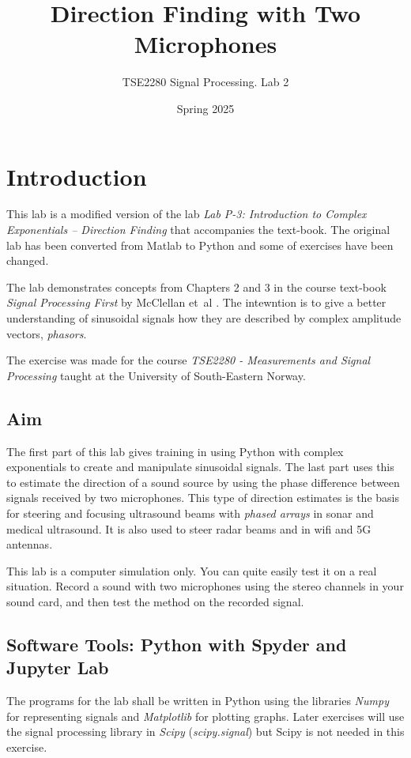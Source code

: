 


\logo
\thispagestyle{fancy}	

\title{Direction Finding with Two Microphones} 
\author{TSE2280 Signal Processing. Lab 2}
\date{Spring 2025}
\maketitle


\section{Introduction}
\suppressfloats[t]
This lab is a modified version of the lab \emph{Lab P-3: Introduction to Complex Exponentials – Direction Finding}\cite{mcclellan_lab_2016} that accompanies the text-book. The original lab has been converted from Matlab to Python and some of exercises have been changed. 

The lab demonstrates concepts from Chapters 2 and 3 in the course text-book \emph{Signal Processing First} by McClellan et~al \cite{mcclellan_dsp_2016}. The intewntion is to give a better understanding of sinusoidal signals how they are described by complex amplitude vectors, \emph{phasors}.

The exercise was made for the course \emph{TSE2280 - Measurements and Signal Processing} taught at the University of South-Eastern Norway.

\subsection{Aim}
The first part of this lab gives training in using Python with complex exponentials to create and manipulate sinusoidal  signals. The last part uses  this to estimate the direction of a sound source by using the phase difference between signals received by two microphones. 
This type of direction estimates is the basis for steering and focusing ultrasound beams with \emph{phased arrays} in sonar and medical ultrasound. It is also used to steer radar beams and in wifi and 5G antennas.

This lab is a computer simulation only. You can quite easily test it on a real situation. Record a sound with two microphones using the stereo channels in your sound card, and then test the method on the recorded signal.


\subsection{Software Tools: Python with Spyder and Jupyter Lab}
The programs for the lab shall be written in Python using the libraries \emph{Numpy} for representing signals and \emph{Matplotlib} for plotting graphs. Later exercises will use the signal processing library in \emph{Scipy} (\emph{scipy.signal}) but Scipy is not needed in this exercise.

